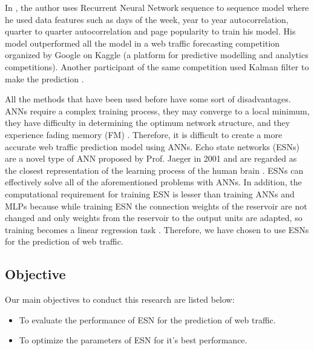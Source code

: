   In \cite{winner}, the author uses Recurrent Neural Network sequence to sequence model where he used data features such as days of the week, year to year autocorrelation, quarter to quarter autocorrelation and page popularity to train his model.  His model outperformed all the model in a web traffic forecasting competition organized by Google on Kaggle (a platform for predictive modelling and analytics competitions).
  Another participant of the same competition used Kalman filter to make the prediction \cite{otto}. %

  All the methods that have been used before have some sort of disadvantages. ANNs require a complex training process, they may converge to a local minimum, they have difficulty in determining the optimum network structure, and they experience fading memory (FM) \cite{wind}. Therefore, it is difficult to create a more accurate web traffic prediction model using ANNs.  Echo state networks (ESNs) are a novel type of ANN proposed by Prof. Jaeger in 2001 and are regarded as the closest representation of the learning process of the human brain \cite{Jaeger:science}. 
  ESNs can effectively solve all of the aforementioned problems with ANNs. In addition, the computational requirement for training ESN is lesser than training ANNs and MLPs because while training ESN the connection weights of the reservoir are not changed and only weights from the reservoir to the output units are adapted, so training becomes a linear regression task \cite{Holzmann07echostate, wind}.  Therefore, we have chosen to use ESNs for the prediction of web traffic.\\

  \subsection{Objective}
  Our main objectives to conduct this research are listed below:
  \begin{itemize}
  	\item To evaluate the performance of ESN for the prediction of web traffic.
  	\item To optimize the parameters of ESN for it's best performance.
    \end{itemize}
